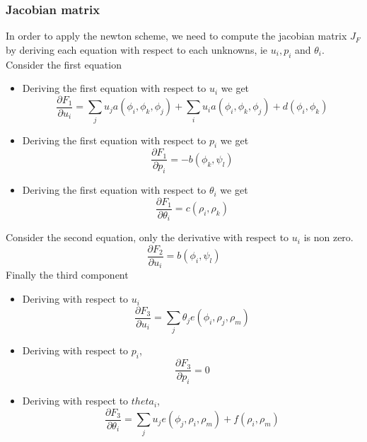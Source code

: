\subsubsection{Jacobian matrix}
  In order to apply the newton scheme, we need to compute the jacobian
  matrix $J_F$ by deriving each equation with respect to each
  unknowns, ie $u_i, p_i$ and $\theta_i$.
  Consider the first equation
  \begin{itemize}
  \item Deriving the first equation with respect to $u_i$ we get
    \begin{equation}
      \label{notes:eq:30}
      \frac{\partial F_1}{\partial u_i} = \sum_j u_j a(\phi_i,\phi_k,\phi_j) + \sum_i u_i a(\phi_i,\phi_k,\phi_j) + d(\phi_i,\phi_k)
    \end{equation}
  \item Deriving the first equation with respect to $p_i$ we get
    \begin{equation}
      \label{notes:eq:30}
      \frac{\partial F_1}{\partial p_i} =  -b(\phi_k,\psi_l)
    \end{equation}
  \item Deriving the first equation with respect to $\theta_i$ we get
    \begin{equation}
      \label{notes:eq:30}
      \frac{\partial F_1}{\partial \theta_i} = c(\rho_i,\rho_k)
    \end{equation}

  \end{itemize}
  Consider the second equation, only the derivative with respect to $u_i$ is non zero.
  \begin{equation}
    \label{notes:eq:31}
    \frac{\partial F_2}{\partial u_i} = b(\phi_i,\psi_l)
  \end{equation}
  Finally the third component
  \begin{itemize}
  \item Deriving with respect to $u_i$
    \begin{equation}
      \label{notes:eq:33}
      \frac{\partial F_3}{\partial u_i} = \sum_j \theta_j e(\phi_i,\rho_j,\rho_m)
    \end{equation}
  \item Deriving with respect to $p_i$,
    \begin{equation}
      \label{notes:eq:34}
      \frac{\partial F_3}{\partial p_i} = 0
    \end{equation}
  \item Deriving with respect to $theta_i$,
    \begin{equation}
      \label{notes:eq:35}
      \frac{\partial F_3}{\partial \theta_i} = \sum_j u_j e(\phi_j,\rho_i,\rho_m) + f(\rho_i,\rho_m)
    \end{equation}
  \end{itemize}
